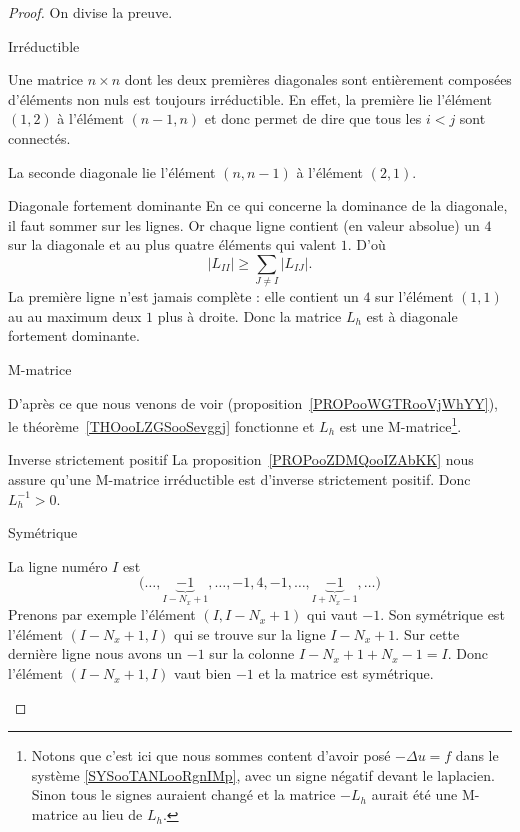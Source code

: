 \begin{proof}

	On divise la preuve.
	\begin{subproof}
		\item[Irréductible]

		Une matrice \( n\times n\) dont les deux premières diagonales sont entièrement composées d'éléments non nuls est toujours irréductible. En effet, la première lie l'élément \( (1,2)\) à l'élément \( (n-1,n)\) et donc permet de dire que tous les \( i<j\) sont connectés.

		La seconde diagonale lie l'élément \( (n,n-1)\) à l'élément \( (2,1)\).

		\item[Diagonale fortement dominante]
		En ce qui concerne la dominance de la diagonale, il faut sommer sur les lignes. Or chaque ligne contient (en valeur absolue) un \( 4\) sur la diagonale et au plus quatre éléments qui valent \( 1\). D'où
		\begin{equation}
			| L_{II} |\geq \sum_{J\neq I}| L_{IJ} |.
		\end{equation}
		La première ligne n'est jamais complète : elle contient un \( 4\) sur l'élément \( (1,1)\) au au maximum deux \( 1\) plus à droite. Donc la matrice \( L_h\) est à diagonale fortement dominante.

		\item[M-matrice]

		D'après ce que nous venons de voir (proposition~\ref{PROPooWGTRooVjWhYY}), le théorème~\ref{THOooLZGSooSevggj} fonctionne et \( L_h\) est une M-matrice\footnote{Notons que c'est ici que nous sommes content d'avoir posé \( -\Delta u=f\) dans le système \eqref{SYSooTANLooRgnIMp}, avec un signe négatif devant le laplacien. Sinon tous le signes auraient changé et la matrice \( -L_h\) aurait été une M-matrice au lieu de \( L_h\).}.

		\item[Inverse strictement positif]
		La proposition~\ref{PROPooZDMQooIZAbKK} nous assure qu'une M-matrice irréductible est d'inverse strictement positif. Donc \( L_h^{-1}>0\).
		\item[Symétrique]

		La ligne numéro \( I\) est
		\begin{equation}
			\big( \ldots ,\underbrace{-1}_{I-N_x+1},\ldots,-1,4,-1,\ldots,\underbrace{-1}_{I+N_x-1},\ldots \big)
		\end{equation}
		Prenons par exemple l'élément \( (I,I-N_x+1)\) qui vaut \( -1\). Son symétrique est l'élément \( (I-N_x+1,I)\) qui se trouve sur la ligne \( I-N_x+1\). Sur cette dernière ligne nous avons un \( -1\) sur la colonne \( I-N_x+1+N_x-1=I\). Donc l'élément \( (I-N_x+1,I)\) vaut bien \( -1\) et la matrice est symétrique.


\end{subproof}
\end{proof}
